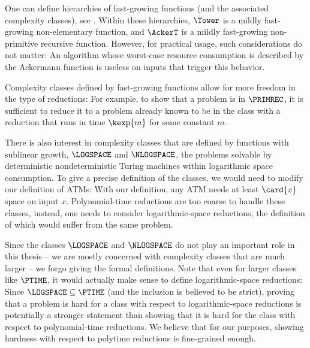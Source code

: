 \documentclass[../../diss.tex]{subfiles}
\begin{document}
\begin{remark*}
    \begin{thmenumerate}[a)]
        \item
            One can define hierarchies of fast-growing functions (and the associated complexity classes), see \eg \cite{Schmitz16}.
            Within these hierarchies, $\Tower$ is a mildly fast-growing non-elementary function, and $\AckerT$ is a mildly fast-growing non-primitive recursive function.
            However, for practical usage, such considerations do not matter:
            An algorithm whose worst-case resource consumption is described by the Ackermann function is useless on inputs that trigger this behavior.
        \item
            Complexity classes defined by fast-growing functions allow for more freedom in the type of reductions:
            For example, to show that a problem is in $\PRIMREC$, it is sufficient to reduce it to a problem already known to be in the class with a reduction that runs in time $\kexp{m}$ for some constant $m$.
        \item
            There is also interest in complexity classes that are defined by functions with sublinear growth, \eg $\LOGSPACE$ and $\NLOGSPACE$, the problems solvable by deterministic \resp nondeterministic Turing machines within logarithmic space consumption.
            To give a precise definition of the classes, we would need to modify our definition of ATMs: With our definition, any ATM needs at least $\card{x}$ space on input $x$.
            Polynomial-time reductions are too coarse to handle these classes, instead, one needs to consider logarithmic-space reductions, the definition of which would suffer from the same problem.

            Since the classes $\LOGSPACE$ and $\NLOGSPACE$ do not play an important role in this thesis -- we are mostly concerned with complexity classes that are much larger -- we forgo giving the formal definitions.
            Note that even for larger classes like $\PTIME$, it would actually make sense to define logarithmic-space reductions:
            Since $\LOGSPACE \subseteq \PTIME$ (and the inclusion is believed to be strict), proving that a problem is hard for a class with respect to logarithmic-space reductions is potentially a stronger statement than showing that it is hard for the class with respect to polynomial-time reductions.
            We believe that for our purposes, showing hardness with respect to polytime reductions is fine-grained enough.
    \end{thmenumerate}
\end{remark*}
\end{document}
